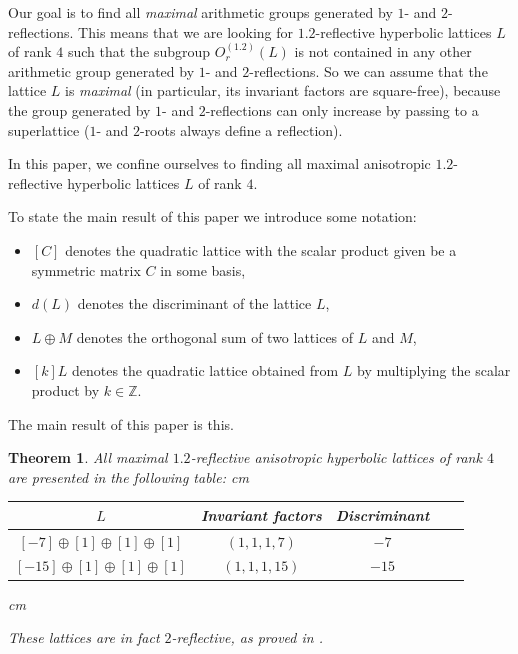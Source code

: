 \documentclass[14pt]{article}
\newtheorem{theorem}{\indent Theorem}[section]
\begin{document}
Our goal is to find all \textit{maximal} arithmetic groups generated
by $1$- and $2$-reflections. This means that we are looking for
$1.2$-reflective hyperbolic lattices $L$ of rank $4$ such that
the subgroup $O^{(1.2)}_r (L)$ is not contained in any other
arithmetic group generated by $1$- and $2$-reflections.
So we can assume that the lattice $L$ is \textit{maximal} (in particular,
its invariant factors are square-free), because
the group generated by $1$- and $2$-reflections can only increase by
passing to a superlattice ($1$- and $2$-roots always define a reflection).

In this paper, we confine ourselves to finding all maximal anisotropic
$1.2$-reflective hyperbolic lattices $L$ of rank $4$.

To state the main result of this paper we introduce some notation:

\begin{itemize}
\item  $[C]$ denotes  the quadratic lattice with the scalar product
given be a symmetric matrix $C$  in some basis,

\item $d(L)$ denotes  the discriminant of the lattice $L$,

\item $L \oplus M$ denotes the orthogonal sum of two lattices of $ L $ and $ M $,

\item $ [k]L $ denotes  the quadratic lattice obtained from  $L$ by multiplying
the scalar product by $k \in \mathbb{Z} $.
\end{itemize}

The main result of this paper is this.

\begin{theorem}\label{osn-res}
All maximal $1.2$-reflective anisotropic hyperbolic  lattices of rank $4$ are
presented in the following table:
 cm
\begin{small}
\begin{tabular} {| c | c | c | c | c |}
\hline
$L$ & Invariant factors & Discriminant \\
\hline
$[- 7] \oplus [1] \oplus [1] \oplus [1]$ & $(1, 1, 1, 7)$ &  $-7$ \\
\hline
$[- 15] \oplus [1] \oplus [1] \oplus [1]$ & $(1, 1, 1, 15)$ & $-15$ \\
\hline
\end{tabular}
\end{small}
 cm

These lattices are in fact  $2$-reflective, as proved in \cite{vinberg07classhyplat}.
\end{theorem}
\end{document}
